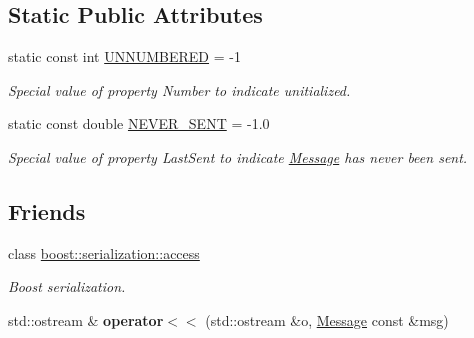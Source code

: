 \subsection*{Static Public Attributes}
\begin{DoxyCompactItemize}
\item 
\hypertarget{classPseudoTcp_1_1Message_af700d12cf3f42af92dd2bf65cf9a20a3}{
static const int \hyperlink{classPseudoTcp_1_1Message_af700d12cf3f42af92dd2bf65cf9a20a3}{UNNUMBERED} = -\/1}
\label{classPseudoTcp_1_1Message_af700d12cf3f42af92dd2bf65cf9a20a3}

\begin{DoxyCompactList}\small\item\em Special value of property Number to indicate unitialized. \item\end{DoxyCompactList}\item 
\hypertarget{classPseudoTcp_1_1Message_a28f26b18c79f0081d076b4ff521cea37}{
static const double \hyperlink{classPseudoTcp_1_1Message_a28f26b18c79f0081d076b4ff521cea37}{NEVER\_\-SENT} = -\/1.0}
\label{classPseudoTcp_1_1Message_a28f26b18c79f0081d076b4ff521cea37}

\begin{DoxyCompactList}\small\item\em Special value of property LastSent to indicate \hyperlink{classPseudoTcp_1_1Message}{Message} has never been sent. \item\end{DoxyCompactList}\end{DoxyCompactItemize}
\subsection*{Friends}
\begin{DoxyCompactItemize}
\item 
\hypertarget{classPseudoTcp_1_1Message_ac98d07dd8f7b70e16ccb9a01abf56b9c}{
class \hyperlink{classPseudoTcp_1_1Message_ac98d07dd8f7b70e16ccb9a01abf56b9c}{boost::serialization::access}}
\label{classPseudoTcp_1_1Message_ac98d07dd8f7b70e16ccb9a01abf56b9c}

\begin{DoxyCompactList}\small\item\em Boost serialization. \item\end{DoxyCompactList}\item 
\hypertarget{classPseudoTcp_1_1Message_ab393938982c2c1738d4a96618c53e340}{
std::ostream \& {\bfseries operator$<$$<$} (std::ostream \&o, \hyperlink{classPseudoTcp_1_1Message}{Message} const \&msg)}
\label{classPseudoTcp_1_1Message_ab393938982c2c1738d4a96618c53e340}

\end{DoxyCompactItemize}


